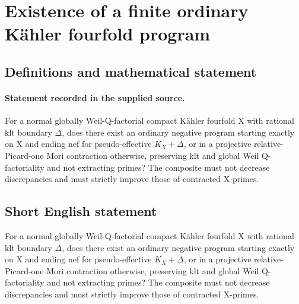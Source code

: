 \documentclass[11pt]{article}
\begin{document}
\section*{Existence of a finite ordinary Kähler fourfold program}\label{30007025}
\subsection{Definitions and mathematical statement}
\paragraph{Statement recorded in the supplied source.}
For a normal globally Weil-Q-factorial compact Kähler fourfold X with rational klt boundary $\Delta $, does there exist an ordinary negative program starting exactly on X and ending nef for pseudo-effective $K_X+\Delta $, or in a projective relative-Picard-one Mori contraction otherwise, preserving klt and global Weil Q-factoriality and not extracting primes? The composite must not decrease discrepancies and must strictly improve those of contracted X-primes.
\subsection{Short English statement}
For a normal globally Weil-Q-factorial compact Kähler fourfold X with rational klt boundary $\Delta $, does there exist an ordinary negative program starting exactly on X and ending nef for pseudo-effective $K_X+\Delta $, or in a projective relative-Picard-one Mori contraction otherwise, preserving klt and global Weil Q-factoriality and not extracting primes? The composite must not decrease discrepancies and must strictly improve those of contracted X-primes.
\end{document}
